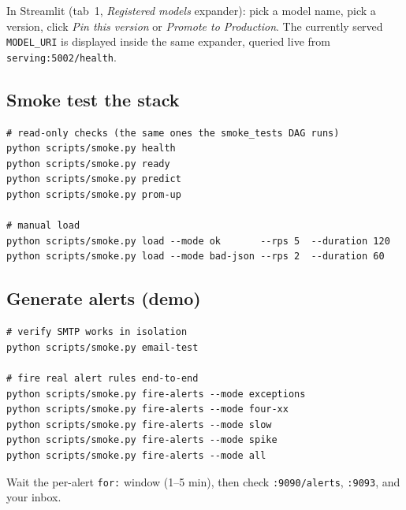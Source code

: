 \documentclass[11pt,a4paper]{article}
\begin{document}
In Streamlit (tab~1, \emph{Registered models} expander): pick a model name, pick a version, click \emph{Pin this version} or \emph{Promote to Production}. The currently served \texttt{MODEL\_URI} is displayed inside the same expander, queried live from \texttt{serving:5002/health}.

\subsection{Smoke test the stack}

\begin{lstlisting}[style=bashstyle]
# read-only checks (the same ones the smoke_tests DAG runs)
python scripts/smoke.py health
python scripts/smoke.py ready
python scripts/smoke.py predict
python scripts/smoke.py prom-up

# manual load
python scripts/smoke.py load --mode ok       --rps 5  --duration 120
python scripts/smoke.py load --mode bad-json --rps 2  --duration 60
\end{lstlisting}

\subsection{Generate alerts (demo)}

\begin{lstlisting}[style=bashstyle]
# verify SMTP works in isolation
python scripts/smoke.py email-test

# fire real alert rules end-to-end
python scripts/smoke.py fire-alerts --mode exceptions
python scripts/smoke.py fire-alerts --mode four-xx
python scripts/smoke.py fire-alerts --mode slow
python scripts/smoke.py fire-alerts --mode spike
python scripts/smoke.py fire-alerts --mode all
\end{lstlisting}

Wait the per-alert \texttt{for:} window (1--5 min), then check \texttt{:9090/alerts}, \texttt{:9093}, and your inbox.
\end{document}
